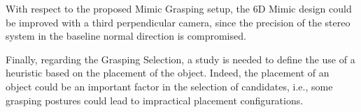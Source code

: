 With respect to the proposed Mimic Grasping setup, the 6D Mimic design could be improved with a third perpendicular camera, since the precision of the stereo system in the baseline normal direction is compromised.

Finally, regarding the Grasping Selection, a study is needed to define the use of a heuristic based on the placement of the object. Indeed, the placement of an object could be an important factor in the selection of candidates, i.e., some grasping postures could lead to impractical placement configurations.



  









